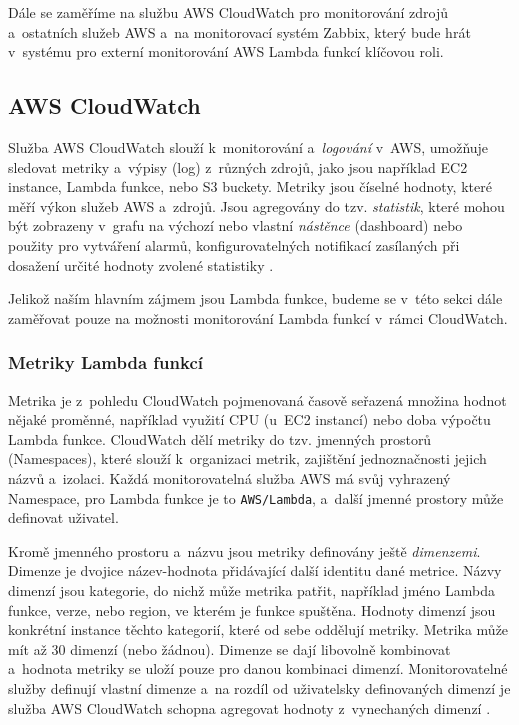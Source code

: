 \documentclass[czech, ing, kiv, he, iso690]{fasthesis}
\begin{document}
Dále se zaměříme na službu AWS CloudWatch pro monitorování zdrojů a~ostatních služeb AWS a~na monitorovací systém Zabbix, který bude hrát v~systému pro externí monitorování AWS Lambda funkcí klíčovou roli.

\subsection{AWS CloudWatch}
\label{sec:aws-cloudwatch}
Služba AWS CloudWatch slouží k~monitorování a~\emph{logování} v~AWS, umožňuje sledovat metriky a~výpisy (log) z~různých zdrojů, jako jsou například EC2 instance, Lambda funkce, nebo S3 buckety. Metriky jsou číselné hodnoty, které měří výkon služeb AWS a~zdrojů. Jsou agregovány do tzv. \emph{statistik}, které mohou být zobrazeny v~grafu na výchozí nebo vlastní \emph{nástěnce} (dashboard) nebo použity pro vytváření alarmů, konfigurovatelných notifikací zasílaných při dosažení určité hodnoty zvolené statistiky \cite{cloudwatch.docs.aws}. 


Jelikož naším hlavním zájmem jsou Lambda funkce, budeme se v~této sekci dále zaměřovat pouze na možnosti monitorování Lambda funkcí v~rámci CloudWatch.

\subsubsection{Metriky Lambda funkcí}
\label{sec:aws-cloudwatch-metrics}
Metrika je z~pohledu CloudWatch pojmenovaná časově seřazená množina hodnot nějaké proměnné, například využití CPU (u~EC2 instancí) nebo doba výpočtu Lambda funkce. CloudWatch dělí metriky do tzv. jmenných prostorů (Namespaces), které slouží k~organizaci metrik, zajištění jednoznačnosti jejich názvů a~izolaci. Každá monitorovatelná služba AWS má svůj vyhrazený Namespace, pro Lambda funkce je to \texttt{AWS/Lambda}, a~další jmenné prostory může definovat uživatel. 

Kromě jmenného prostoru a~názvu jsou metriky definovány ještě \emph{dimenzemi}. Dimenze je dvojice název-hodnota přidávající další identitu dané metrice. Názvy dimenzí jsou kategorie, do nichž může metrika patřit, například jméno Lambda funkce, verze, nebo region, ve kterém je funkce spuštěna. Hodnoty dimenzí jsou konkrétní instance těchto kategorií, které od sebe oddělují metriky. Metrika může mít až 30 dimenzí (nebo žádnou). Dimenze se dají libovolně kombinovat a~hodnota metriky se uloží pouze pro danou kombinaci dimenzí. Monitorovatelné služby definují vlastní dimenze a~na rozdíl od uživatelsky definovaných dimenzí je služba AWS CloudWatch schopna agregovat hodnoty z~vynechaných dimenzí \cite{cloudwatch.docs.aws}. 
\end{document}
